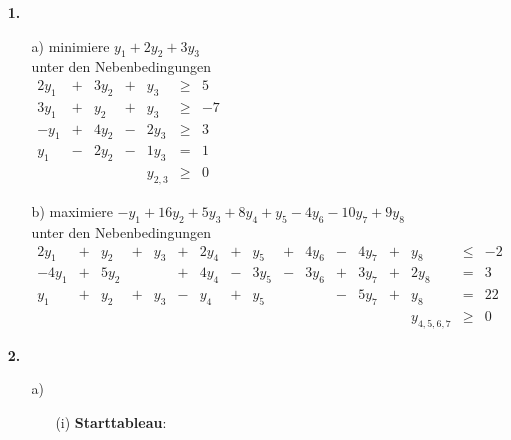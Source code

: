 \documentclass[a4paper,11pt]{article}
\author{\authorinfo}
\title{\titleinfo}
\date{\today}
\begin{document}
\maketitle
\begin{enumerate}

\item[\textbf{1.}]
    \begin{enumerate}
    \item[a)]
        minimiere \( y_1 + 2y_2 + 3y_3 \)\\
        unter den Nebenbedingungen \\
        \(\begin{array}{rcrcrcr}
            2y_1 & + & 3y_2 & + &  y_3 & \geq & 5 \\
            3y_1 & + &  y_2 & + &  y_3 & \geq & -7 \\
            -y_1 & + & 4y_2 & - & 2y_3 & \geq & 3 \\
             y_1 & - & 2y_2 & - & 1y_3 & =    & 1 \\
                 &   &      &   & y_{2,3} & \geq & 0
        \end{array}\)

    \item[b)]
        maximiere \( -y_1 + 16y_2 + 5y_3 + 8y_4 + y_5 - 4y_6 - 10y_7 + 9y_8 \)\\
        unter den Nebenbedingungen \\
        \(\begin{array}{rcrcrcrcrcrcrcrcr}
            2y_1 & + &  y_2 & + &  y_3 & + & 2y_4 & + &  y_5 & + & 4y_6 & - & 4y_7 & + &  y_8 & \leq & -2 \\
           -4y_1 & + & 5y_2 &   &      & + & 4y_4 & - & 3y_5 & - & 3y_6 & + & 3y_7 & + & 2y_8 & =    & 3 \\
             y_1 & + &  y_2 & + &  y_3 & - &  y_4 & + &  y_5 &   &      & - & 5y_7 & + &  y_8 & =    & 22 \\
                 &   &      &   &      &   &      &   &      &   &      &   &      &   & y_{4,5,6,7} & \geq & 0
        \end{array}\)
    \end{enumerate}

\item[\textbf{2.}]
    \begin{enumerate}
    \item[a)]
        \begin{enumerate}
        \item[(i)]
            \textbf{Starttableau}:


\end{enumerate}
\end{enumerate}
\end{enumerate}
\end{document}
